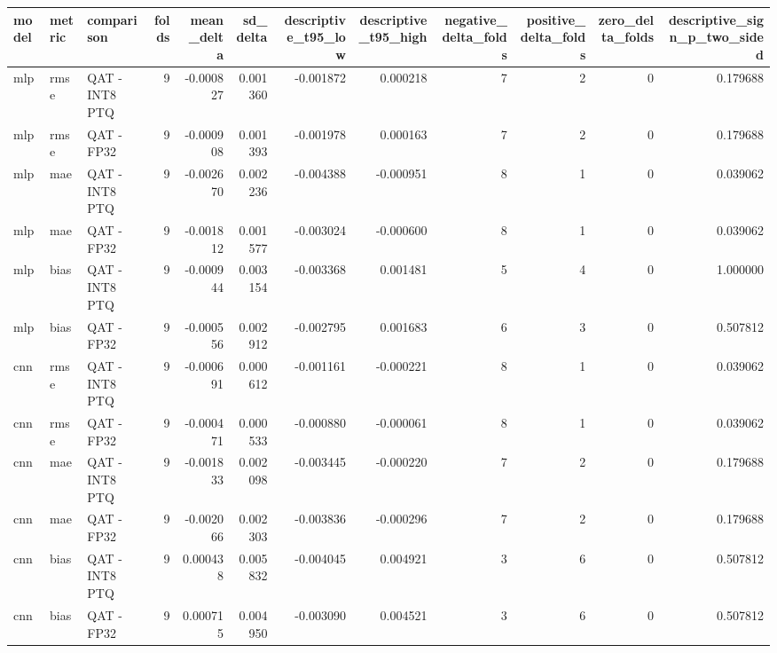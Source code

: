 \begin{tabular}{lllrrrrrrrrr}
\toprule
model & metric & comparison & folds & mean\_delta & sd\_delta & descriptive\_t95\_low & descriptive\_t95\_high & negative\_delta\_folds & positive\_delta\_folds & zero\_delta\_folds & descriptive\_sign\_p\_two\_sided \\
\midrule
mlp & rmse & QAT - INT8 PTQ & 9 & -0.000827 & 0.001360 & -0.001872 & 0.000218 & 7 & 2 & 0 & 0.179688 \\
mlp & rmse & QAT - FP32 & 9 & -0.000908 & 0.001393 & -0.001978 & 0.000163 & 7 & 2 & 0 & 0.179688 \\
mlp & mae & QAT - INT8 PTQ & 9 & -0.002670 & 0.002236 & -0.004388 & -0.000951 & 8 & 1 & 0 & 0.039062 \\
mlp & mae & QAT - FP32 & 9 & -0.001812 & 0.001577 & -0.003024 & -0.000600 & 8 & 1 & 0 & 0.039062 \\
mlp & bias & QAT - INT8 PTQ & 9 & -0.000944 & 0.003154 & -0.003368 & 0.001481 & 5 & 4 & 0 & 1.000000 \\
mlp & bias & QAT - FP32 & 9 & -0.000556 & 0.002912 & -0.002795 & 0.001683 & 6 & 3 & 0 & 0.507812 \\
cnn & rmse & QAT - INT8 PTQ & 9 & -0.000691 & 0.000612 & -0.001161 & -0.000221 & 8 & 1 & 0 & 0.039062 \\
cnn & rmse & QAT - FP32 & 9 & -0.000471 & 0.000533 & -0.000880 & -0.000061 & 8 & 1 & 0 & 0.039062 \\
cnn & mae & QAT - INT8 PTQ & 9 & -0.001833 & 0.002098 & -0.003445 & -0.000220 & 7 & 2 & 0 & 0.179688 \\
cnn & mae & QAT - FP32 & 9 & -0.002066 & 0.002303 & -0.003836 & -0.000296 & 7 & 2 & 0 & 0.179688 \\
cnn & bias & QAT - INT8 PTQ & 9 & 0.000438 & 0.005832 & -0.004045 & 0.004921 & 3 & 6 & 0 & 0.507812 \\
cnn & bias & QAT - FP32 & 9 & 0.000715 & 0.004950 & -0.003090 & 0.004521 & 3 & 6 & 0 & 0.507812 \\
\bottomrule
\end{tabular}
